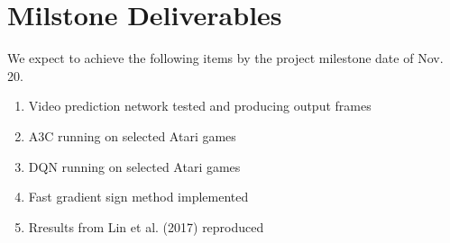 \section{Milstone Deliverables}

We expect to achieve the following items by the project milestone date of Nov. 20.

\begin{enumerate}
    \item Video prediction network tested and producing output frames
    \item A3C running on selected Atari games
    \item DQN running on selected Atari games
    \item Fast gradient sign method implemented
    \item Rresults from Lin et al. (2017) reproduced
\end{enumerate}
